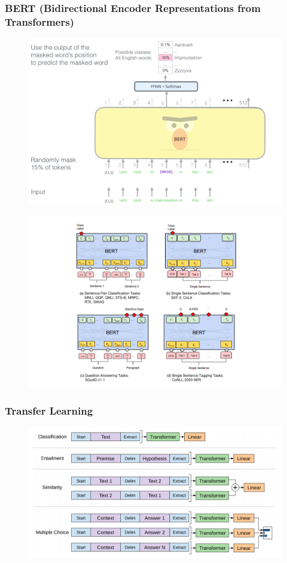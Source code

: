 \documentclass[notheorems, handout]{beamer}
\begin{document}
	\begin{frame}
		\frametitle{BERT (Bidirectional Encoder Representations from Transformers)}
		\begin{figure}[H]
			\begin{center}
				\includegraphics[scale=0.12]{img/bert.png}
			\end{center}
		\end{figure}
		\begin{figure}[H]
			\begin{center}
				\includegraphics[scale=0.15]{img/bert2.png}
			\end{center}
		\end{figure}
	\end{frame}
	
	\begin{frame}
	\frametitle{Transfer Learning}
		\begin{figure}[H]
			\begin{center}
				\includegraphics[scale=0.3]{img/gpt-tuning.png}
			\end{center}
		\end{figure}
	\end{frame}
	
\end{document}
